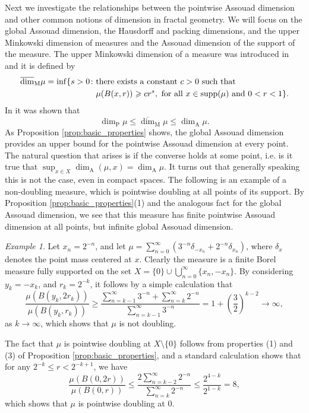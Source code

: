 \documentclass{PRM}
\newcommand{\updim}{\overline{\dim}}
\newcommand{\adim}{\dim_{\mathrm{A}}}
\theoremstyle{plain}
\theoremstyle{definition}
\theoremstyle{remark}
\newtheorem{example}[thm]{Example}
\begin{document}
Next we investigate the relationships between the pointwise Assouad dimension and other common notions of dimension in fractal geometry. We will focus on the global Assouad dimension, the Hausdorff and packing dimensions, and the upper Minkowski dimension of measures and the Assouad dimension of the support of the measure. The upper Minkowski dimension of a measure was introduced in \cite{KFF} and it is defined by
\begin{align*}
    \updim_{\mathrm{M}}\mu=\inf\{s>0\colon &\textnormal{there exists a constant }c>0\textnormal{ such that}\\
    &\mu(B(x,r))\geq cr^s,  \textnormal{ for all }x\in \text{supp}(\mu)\textnormal{ and }0<r<1\}.
\end{align*}
In \cite[Proposition 4.1]{KFF} it was shown that
\begin{equation}\label{eq:general_relationship}
    \dim_{\mathrm{P}}\mu\leq \updim_{\mathrm{M}}\mu\leq \dim_{\mathrm{A}}\mu.
\end{equation}
As Proposition \ref{prop:basic_properties} shows, the global Assouad dimension provides an upper bound for the pointwise Assouad dimension at every point. The natural question that arises is if the converse holds at some point, i.e. is it true that $\sup_{x\in X}\adim(\mu,x)=\adim\mu$. It turns out that generally speaking this is not the case, even in compact spaces. The following is an example of a non-doubling measure, which is pointwise doubling at all points of its support. By Proposition \ref{prop:basic_properties}(1) and the analogous fact for the global Assouad dimension, we see that this measure has finite pointwise Assouad dimension at all points, but infinite global Assouad dimension.

\begin{example}\label{ex:loc_not_glob_doubling}
    Let $x_n=2^{-n}$, and let $\mu=\sum_{n=0}^{\infty}(3^{-n}\delta_{-x_n}+2^{-n}\delta_{x_n})$, where $\delta_x$ denotes the point mass centered at $x$. Clearly the measure is a finite Borel measure fully supported on the set $X=\{0\}\cup\bigcup_{n=0}^{\infty}\{x_n,-x_n\}$. By considering $y_k=-x_k$, and $r_k=2^{-k}$, it follows by a simple calculation that
    \begin{equation*}
        \frac{\mu(B(y_k,2r_k))}{\mu(B(y_k,r_k))}\geq\frac{\sum_{n=k-1}^{\infty}3^{-n}+\sum_{n=k}^{\infty}2^{-n}}{\sum_{n=k-1}^{\infty}3^{-n}}=1+\left(\frac{3}{2}\right)^{k-2} \to \infty,
    \end{equation*}
    as $k\to\infty$, which shows that $\mu$ is not doubling.
    
    The fact that $\mu$ is pointwise doubling at $X\setminus\{0\}$ follows from properties (1) and (3) of Proposition \ref{prop:basic_properties}, and a standard calculation shows that for any  $2^{-k}\leq r < 2^{-k+1}$, we have
    \begin{equation*}
        \frac{\mu(B(0,2r))}{\mu(B(0,r))}\leq \frac{2\sum_{n=k-2}^{\infty}2^{-n}}{\sum_{n=k}^{\infty}2^{-n}}\leq\frac{2^{4-k}}{2^{1-k}}=8,
    \end{equation*}
    which shows that $\mu$ is pointwise doubling at $0$.
\end{example}
\end{document}
